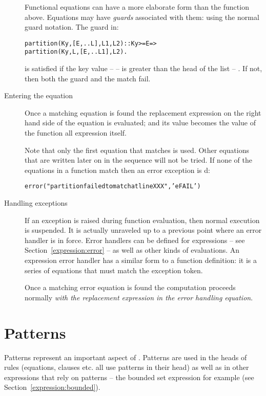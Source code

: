 \begin{description}
Functional equations can have a more elaborate form than the  function above. Equations may have \emph{guards} associated with them: using the normal guard \q{::} notation. The guard in:
\begin{alltt}
partition(Ky,[E,..L],L1,L2)::Ky>=E =>
    partition(Ky,L,[E,..L1],L2).
\end{alltt}
is satisfied if the key value --  -- is greater than the head of the list -- . If not, then both the guard and the match fail.

\item[Entering the equation]
Once a matching equation is found the replacement expression on the right hand side of the equation is evaluated; and its value becomes the value of the function all expression itself.

Note that only the first equation that matches is used. Other equations that are written later on in the sequence will not be tried.
If none of the equations in a function match then an  error exception is d:
\begin{alltt}
error("partition failed to match at line XXX",'eFAIL')
\end{alltt}

\item[Handling exceptions]
If an exception is raised during function evaluation, then normal execution is suspended. It is actually unraveled up to a previous point where an error handler is in force. Error handlers can be defined for expressions -- see Section~\vref{expression:error} -- as well as other kinds of evaluations. An expression error handler has a similar form to a function definition: it is a series of equations that must match the exception token.

Once a matching error equation is found the computation proceeds normally \emph{with the replacement expression in the error handling equation}.
\end{description}

\section{Patterns}
\label{expression:pattern}
Patterns represent an important aspect of \go. Patterns are used in the heads of rules (equations, clauses etc. all use patterns in their head) as well as in other expressions that rely on patterns -- the bounded set expression for example (see Section~\vref{expression:bounded}).

